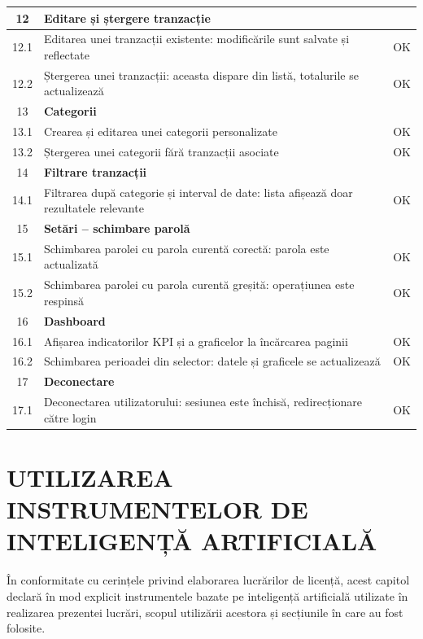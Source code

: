 \documentclass[12pt,a4paper,oneside]{report}
\begin{document}
\begin{center}
\begin{longtable}{|c|p{11cm}|c|}
\hline
12 & \textbf{Editare și ștergere tranzacție} & \\
\hline
12.1 & Editarea unei tranzacții existente: modificările sunt salvate și reflectate & OK \\
\hline
12.2 & Ștergerea unei tranzacții: aceasta dispare din listă, totalurile se actualizează & OK \\
\hline
13 & \textbf{Categorii} & \\
\hline
13.1 & Crearea și editarea unei categorii personalizate & OK \\
\hline
13.2 & Ștergerea unei categorii fără tranzacții asociate & OK \\
\hline
14 & \textbf{Filtrare tranzacții} & \\
\hline
14.1 & Filtrarea după categorie și interval de date: lista afișează doar rezultatele relevante & OK \\
\hline
15 & \textbf{Setări -- schimbare parolă} & \\
\hline
15.1 & Schimbarea parolei cu parola curentă corectă: parola este actualizată & OK \\
\hline
15.2 & Schimbarea parolei cu parola curentă greșită: operațiunea este respinsă & OK \\
\hline
16 & \textbf{Dashboard} & \\
\hline
16.1 & Afișarea indicatorilor KPI și a graficelor la încărcarea paginii & OK \\
\hline
16.2 & Schimbarea perioadei din selector: datele și graficele se actualizează & OK \\
\hline
17 & \textbf{Deconectare} & \\
\hline
17.1 & Deconectarea utilizatorului: sesiunea este închisă, redirecționare către login & OK \\
\hline
\end{longtable}
\end{center}

\chapter{UTILIZAREA INSTRUMENTELOR DE INTELIGENȚĂ ARTIFICIALĂ}

În conformitate cu cerințele privind elaborarea lucrărilor de licență, acest capitol declară în mod explicit instrumentele bazate pe inteligență artificială utilizate în realizarea prezentei lucrări, scopul utilizării acestora și secțiunile în care au fost folosite.
\end{document}
